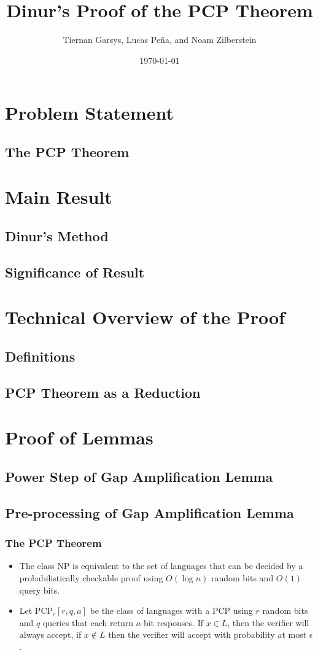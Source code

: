 \documentclass{beamer}
\title{Dinur's Proof of the PCP Theorem}
\author{Tiernan Garsys, Lucas Pe\~{n}a, and Noam Zilberstein}
\date{\today}
\begin{document}
\frame{\titlepage}

\section[Outline]{}
\frame{\tableofcontents}

\section{Problem Statement}
\subsection{The PCP Theorem}
\section{Main Result}
\subsection{Dinur's Method}
\subsection{Significance of Result}
\section{Technical Overview of the Proof}
\subsection{Definitions}
\subsection{PCP Theorem as a Reduction}
\section{Proof of Lemmas}
\subsection{Power Step of Gap Amplification Lemma}
\subsection{Pre-processing of Gap Amplification Lemma}
\frame
{
  \frametitle{The PCP Theorem}

  \begin{itemize}
  \item The class NP is equivalent to the set of languages that can be decided by a probabilistically checkable proof using $O(\log n)$ random bits and $O(1)$ query bits.
  \item Let PCP$_{\epsilon}[r, q, a]$ be the class of languages with a PCP using $r$ random bits and $q$ queries that each return $a$-bit responses.  If $x\in L$, then the verifier will always accept, if $x\not\in L$ then the verifier will accept with probability at most $\epsilon$.   
  \end{itemize}
}
\end{document}

